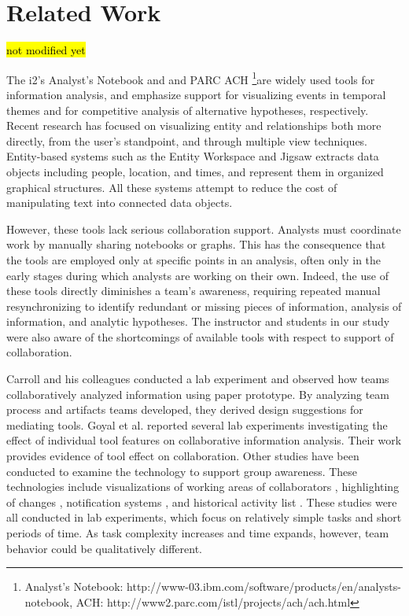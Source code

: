\section{Related Work}
\hl{not modified yet}

The i2's Analyst's Notebook and and PARC ACH \footnote{Analyst's Notebook: http://www-03.ibm.com/software/products/en/analysts-notebook, ACH: http://www2.parc.com/istl/projects/ach/ach.html}are widely used tools for information analysis, and emphasize support for visualizing events in temporal themes and for competitive analysis of alternative hypotheses, respectively. Recent research has focused on visualizing entity and relationships both more directly, from the user's standpoint, and through multiple view techniques. Entity-based systems such as the Entity Workspace \cite{Bier2010} and Jigsaw \cite{Jigsaw2008} extracts data objects including people, location, and times, and represent them in organized graphical structures. All these systems attempt to reduce the cost of manipulating text into connected data objects. 

However, these tools lack serious collaboration support. Analysts must coordinate work by manually sharing notebooks or graphs. This has the consequence that the tools are employed only at specific points in an analysis, often only in the early stages during which analysts are working on their own. Indeed, the use of these tools directly diminishes a team's awareness, requiring repeated manual resynchronizing to identify redundant or missing pieces of information, analysis of information, and analytic hypotheses. The instructor and students in our study were also aware of the shortcomings of available tools with respect to support of collaboration.

Carroll and his colleagues \cite{Borge2012, Carroll2013} conducted a lab experiment and observed how teams collaboratively analyzed information using paper prototype. By analyzing team process and artifacts teams developed, they derived design suggestions for mediating tools.  Goyal et al. \cite{Goyal2013, Goyal2014, Goyal2016}  reported several lab experiments investigating the effect of individual tool features on collaborative information analysis. Their work provides evidence of tool effect on collaboration. Other studies have been conducted to examine the technology to support group awareness. 
These technologies include visualizations of working areas of collaborators \cite{Gutwin1996}, highlighting of changes \cite{Hajizadeh2013}, notification systems \cite{Carroll2003}, and historical activity list \cite{Ganoe2003}. These studies were all conducted in lab experiments, which focus on relatively simple tasks and short periods of time. As task complexity increases and time expands, however, team behavior could be qualitatively different. %

